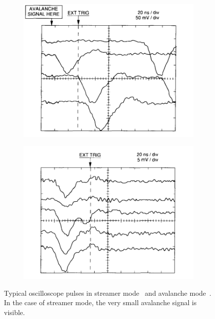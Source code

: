 	\begin{figure}[H]
		\begin{subfigure}{0.5\linewidth}
			\centering
			\includegraphics[width = \linewidth]{fig/chapt3/RPC_Streamer_Mode.png}
			\caption{\label{fig:ModeSignal:A}}
		\end{subfigure}
		\begin{subfigure}{0.5\linewidth}
			\centering
			\includegraphics[width = \linewidth]{fig/chapt3/RPC_Avalanche_Mode.png}\\
			\caption{\label{fig:ModeSignal:B}}
		\end{subfigure}
		\caption{\label{fig:ModeSignal} Typical oscilloscope pulses in streamer mode~ and avalanche mode~. In the case of streamer mode, the very small avalanche signal is visible.}
	\end{figure}
	
